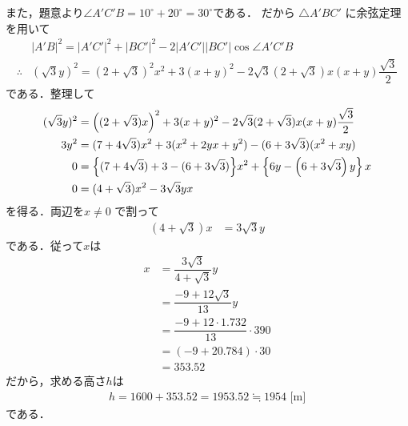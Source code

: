 \documentclass[../../main.tex]{subfiles}
\begin{document}
また，題意より$\angle A'C'B=10^{\circ}+20^{\circ}=30^{\circ}$である．
だから $\triangle A'BC'$ に余弦定理を用いて
\begin{align}
  & |A'B|^2 = |A'C'|^2 + |BC'|^2 - 2|A'C'||BC'|\cos\angle A'C'B \\
  \therefore
  & \left(\sqrt{3}y\right)^2 = \left(2+\sqrt{3}\right)^2x^2 + 3\left(x+y\right)^2 - 2\sqrt{3}\left(2+\sqrt{3}\right)x(x+y)\dfrac{\sqrt{3}}{2}
\end{align}
である．整理して
\begin{align}
  (\sqrt{3}y)^2 &= \Bigl((2+\sqrt{3})x\Bigr)^2 + 3(x+y)^2 - 2\sqrt{3}(2+\sqrt{3})x(x+y)\dfrac{\sqrt{3}}{2} \\
  3y^2 &= (7+4\sqrt{3})x^2 + 3(x^2 + 2yx + y^2) - (6+3\sqrt{3})(x^2 + xy) \\
  0 &= \Bigl\{(7+4\sqrt{3}) + 3 - (6+3\sqrt{3})\Bigr\}x^2 + \left\{6y - \left(6 + 3\sqrt{3}\right)y\right\}x \\
  0 &= (4+\sqrt{3})x^2 - 3\sqrt{3}yx
\end{align}
を得る．両辺を$x \neq 0$ で割って
\begin{align}
  (4+\sqrt{3})x &= 3\sqrt{3}y
\end{align}
である．従って$x$は
\begin{align}
  x
  &= \dfrac{3\sqrt{3}}{4+\sqrt{3}}y \\
  &= \dfrac{-9+12\sqrt{3}}{13}y \\
  &= \dfrac{-9+12\cdot 1.732}{13} \cdot 390 \\
  &= (-9+20.784) \cdot 30 \\
  &= 353.52
\end{align}
だから，求める高さ$h$は
\begin{align}
  h = 1600 + 353.52 = 1953.52 \fallingdotseq 1954\text{ [m]}
\end{align}
である．
\end{document}
